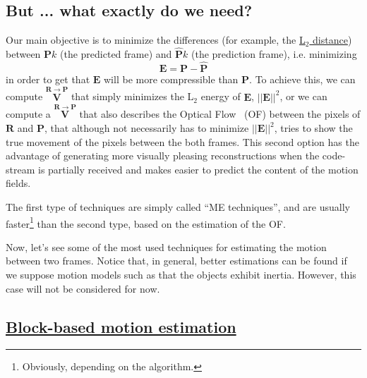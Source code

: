 \subsection{But ... what exactly do we need?}
Our main objective is to minimize the differences (for example, the
\href{https://en.wikipedia.org/wiki/Euclidean_distance}{L$_2$
  distance}) between ${\mathbf P}k$ (the predicted frame) and $\hat{\mathbf P}k$ (the
prediction frame), i.e. minimizing
\begin{equation}
  {\mathbf E} = {\mathbf P} - \hat{\mathbf P}
\end{equation}
in order to get that ${\mathbf E}$ will be more compressible than
${\mathbf P}$. To achieve this, we can compute $\overset{{\mathbf
    R}\rightarrow {\mathbf P}}{\mathbf V}$ that simply minimizes the
L$_2$ energy of ${\mathbf E}$, $||{\mathbf E}||^2$, or we can compute
a $\overset{{\mathbf R}\rightarrow {\mathbf P}}{\mathbf V}$ that also describes the Optical
Flow~\cite{horn1981determining} (OF) between the pixels of ${\mathbf
  R}$ and ${\mathbf P}$, that although not necessarily has to
minimize $||{\mathbf E}||^2$, tries to show the true movement of the
pixels between the both frames. This second option has the advantage
of generating more visually pleasing reconstructions when the
code-stream is partially received and makes easier to predict the
content of the motion fields.

The first type of techniques are simply called ``ME techniques'', and
are usually faster\footnote{Obviously, depending on the algorithm.}
than the second type, based on the estimation of the OF.


Now, let's see some of the most used techniques for estimating the
motion between two frames. Notice that, in general, better estimations
can be found if we suppose motion models such as that the objects
exhibit inertia. However, this case will not be considered for now.

\subsection{\href{https://vicente-gonzalez-ruiz.github.io/video_compression/\#x1-40003}{Block-based motion estimation}}

